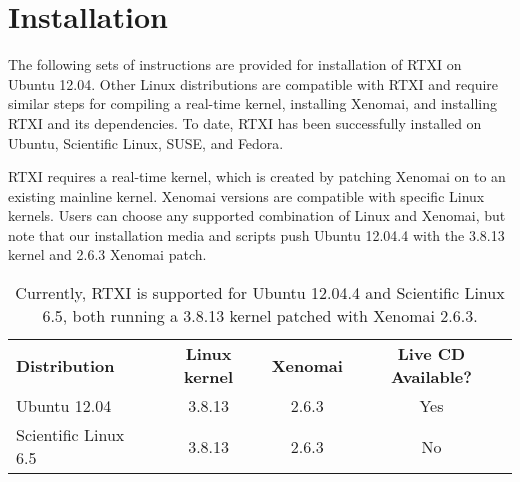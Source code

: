 
\section{Installation}

The following sets of instructions are provided for installation of RTXI on  Ubuntu 12.04. Other Linux distributions are compatible with RTXI and require similar steps for compiling a real-time kernel, installing Xenomai, and installing RTXI and its dependencies. To date, RTXI has been successfully installed on Ubuntu, Scientific Linux, SUSE, and Fedora. 

RTXI requires a real-time kernel, which is created by patching Xenomai on to an existing mainline kernel. Xenomai versions are compatible with specific Linux kernels. Users can choose any supported combination of Linux and Xenomai, but note that our installation media and scripts push Ubuntu 12.04.4 with the 3.8.13 kernel and 2.6.3 Xenomai patch.

\begin{table}[htdp]
\label{configs}
\begin{center}
\vspace{.5cm}
\begin{tabular}{lccc}
\textbf{Distribution} & \textbf{Linux kernel} & \textbf{Xenomai} & \textbf{Live CD Available?}\\
Ubuntu 12.04 & 3.8.13 & 2.6.3 & Yes \\
Scientific Linux 6.5 & 3.8.13 & 2.6.3 & No\\
\end{tabular}
\end{center}
\caption{Currently, RTXI is supported for Ubuntu 12.04.4 and Scientific Linux 6.5, both running a 3.8.13 kernel patched with Xenomai 2.6.3.}
\end{table}%